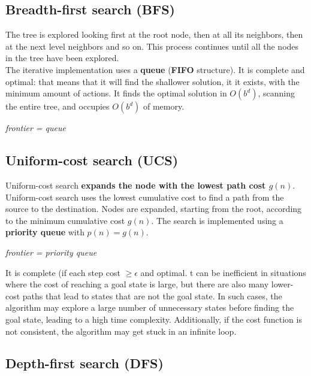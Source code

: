 \documentclass{article}
\begin{document}
\subsection{Breadth-first search (BFS)}

The tree is explored looking first at the root node, then at all its neighbors, then at the next level neighbors and so on. This process continues until all the nodes in the tree have been explored. \\

The iterative implementation uses a \textbf{queue} (\textbf{FIFO} structure). It is complete and optimal: that means that it will find the shallower solution, it it exists, with the minimum amount of actions. It finds the optimal solution in $O(b^d)$, scanning the entire tree, and occupies $O(b^d)$ of memory.

\begin{center}
    \textit{frontier = queue}
\end{center}

\newpage

\subsection{Uniform-cost search (UCS)}

Uniform-cost search \textbf{expands the node with the lowest path cost $g(n)$}. \\

Uniform-cost search uses the lowest cumulative cost to find a path from the source to the destination. Nodes are expanded, starting from the root, according to the minimum cumulative cost $g(n)$. The search is implemented using a \textbf{priority queue} with $p(n) = g(n)$.

\begin{center}
    \textit{frontier = priority queue}
\end{center}

It is complete (if each step cost $\geq \epsilon$ and optimal. t can be inefficient in situations where the cost of reaching a goal state is large, but there are also many lower-cost paths that lead to states that are not the goal state. In such cases, the algorithm may explore a large number of unnecessary states before finding the goal state, leading to a high time complexity. Additionally, if the cost function is not consistent, the algorithm may get stuck in an infinite loop.

\newpage

\subsection{Depth-first search (DFS)}
\end{document}
